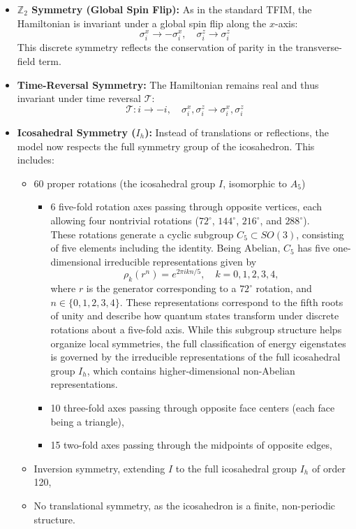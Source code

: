 \documentclass{article}
\begin{document}
\begin{itemize}
    \item \textbf{$\mathbb{Z}_2$ Symmetry (Global Spin Flip):} As in the standard TFIM, the Hamiltonian is invariant under a global spin flip along the $x$-axis:
    \[
    \sigma_i^x \to -\sigma_i^x, \quad \sigma_i^z \to \sigma_i^z
    \]
    This discrete symmetry reflects the conservation of parity in the transverse-field term.

    \item \textbf{Time-Reversal Symmetry:} The Hamiltonian remains real and thus invariant under time reversal $\mathcal{T}$:
    \[
    \mathcal{T}: i \to -i, \quad \sigma_i^x, \sigma_i^z \to \sigma_i^x, \sigma_i^z
    \]

    \item \textbf{Icosahedral Symmetry ($I_h$):} Instead of translations or reflections, the model now respects the full symmetry group of the icosahedron. This includes:
    \begin{itemize}
        \item 60 proper rotations (the icosahedral group $I$, isomorphic to $A_5$)
        
        \begin{itemize}
        \item 6 five-fold rotation axes passing through opposite vertices, each allowing four nontrivial rotations ($72^\circ$, $144^\circ$, $216^\circ$, and $288^\circ$).\\
        These rotations generate a cyclic subgroup \( C_5 \subset SO(3) \), consisting of five elements including the identity. Being Abelian, \( C_5 \) has five one-dimensional irreducible representations given by
	\[
	\rho_k(r^n) = e^{2\pi i k n / 5}, \quad k = 0, 1, 2, 3, 4,
	\]
	where \( r \) is the generator corresponding to a \(72^\circ\) rotation, and \( n \in \{0, 1, 2, 3, 4\} \). These representations correspond to the fifth roots of unity and describe how quantum states transform under discrete rotations about a five-fold axis. While 		this subgroup structure helps organize local symmetries, the full classification of energy eigenstates is governed by the irreducible representations of the full icosahedral group \( I_h \), which contains higher-dimensional non-Abelian representations.

        \item 10 three-fold axes passing through opposite face centers (each face being a triangle),
        \item 15 two-fold axes passing through the midpoints of opposite edges,
    	\end{itemize}   
        \item Inversion symmetry, extending $I$ to the full icosahedral group $I_h$ of order 120,
        \item No translational symmetry, as the icosahedron is a finite, non-periodic structure.
    \end{itemize}
    

\end{itemize}
\end{document}
